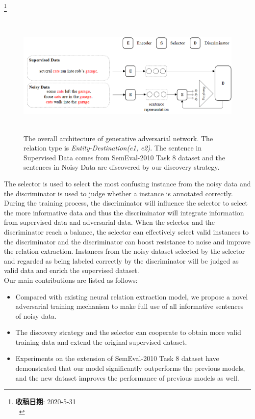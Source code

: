\documentclass[conference]{IEEEtran}
\begin{document}
\footnote{
  \noindent
  \textbf{收稿日期}: 2020-5-31 \\
  \
}

\begin{figure}[h]
  \includegraphics[height=6cm]{architecture.png}
  \caption{The overall architecture of generative adversarial network. The relation type is \textit{Entity-Destination(e1, e2)}. The sentence in Supervised Data comes from SemEval-2010 Task 8 dataset and the sentences in Noisy Data are discovered by our discovery strategy. }
  \label{Architecture}
\end{figure}

The selector is used to select the most confusing instance from the noisy data and the discriminator is used to judge whether a instance is annotated correctly.
During the training process, the discriminator will influence the selector to select the more informative data and thus the discriminator will integrate information from supervised data and adversarial data.  
When the selector and the discriminator reach a balance, the selector can effectively select valid instances to the discriminator and the discriminator can boost resistance to noise and improve the relation extraction.
Instances from the noisy dataset selected by the selector and regarded as being labeled correctly by the discriminator will be judged as valid data and enrich the supervised dataset.
\\Our main contributions are listed as follows:
\begin{itemize}
  \item Compared with existing neural relation extraction model, we propose a novel adversarial training mechanism to make full use of all informative sentences of noisy data.
  \item The discovery strategy and the selector can cooperate to obtain more valid training data and extend the original supervised dataset.
  \item Experiments on the extension of SemEval-2010 Task 8 dataset have demonstrated that our model significantly outperforms the previous models, and the new dataset improves the performance of previous models as well.
\end{itemize}
\end{document}
